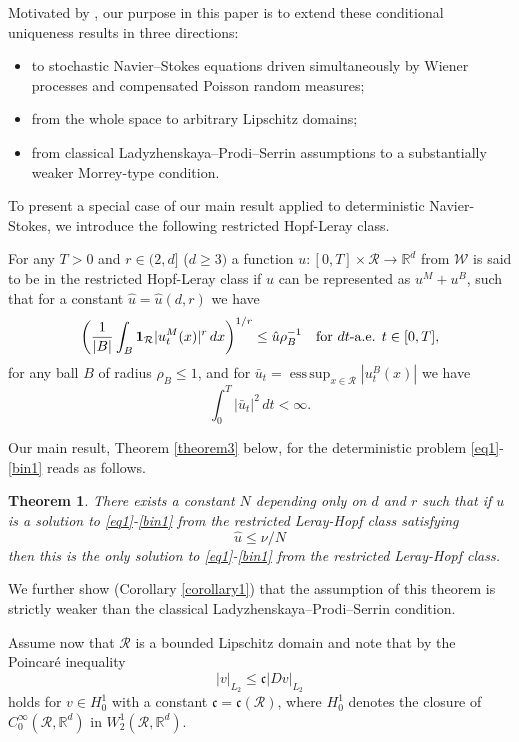\documentclass[11pt,reqno]{amsart}
\DeclareMathOperator*{\esssup}{ess\,sup}
\newtheorem{theorem}{Theorem}[section]
\theoremstyle{definition}
\theoremstyle{remark}
\newcommand\bR{\mathbb{R}}
\newcommand\frc{\mathfrak{c}}
\newcommand\cR{\mathcal{R}}
\newcommand\cW{\mathcal{W}}
\newcommand{\<}{\langle}
\renewcommand{\>}{\rangle}
\begin{document}
Motivated by \cite{GK2026}, our  purpose in this paper 
is to extend these conditional uniqueness results in three directions:

\begin{itemize}
\item to stochastic Navier–Stokes equations driven simultaneously 
by Wiener processes and compensated Poisson random measures;

\item from the whole space to arbitrary Lipschitz domains;

\item from classical Ladyzhenskaya–Prodi–Serrin assumptions to a substantially 
weaker Morrey-type condition.
\end{itemize}
To present a special case of our main result applied to deterministic Navier-Stokes,  
we introduce the following restricted Hopf-Leray class. 

For any $T>0$ and $r\in(2,d]$ ($d\geq3)$ a function $u:[0,T]\times\cR\to\bR^d$ 
from $\cW$ is said to be in the restricted Hopf-Leray class if $u$ can be represented 
as $u^{M}+u^{B}$, such that for a constant $\hat u=\hat u(d,r)$ we have 
$$
\left(\frac{1}{|B|}\int_{B}{\bf1}_{\cR}|u^M_t(x)|^{r}
\,dx\right)^{1/r}\leq \hat u\rho_{B}^{-1} \quad\text{for $dt$-a.e. $t\in[0,T]$}, 
$$
for any ball $B$ of radius $\rho_{B}\leq 1$, and for $\bar u_t=\esssup_{x\in\cR}|u^B_t(x)|$ 
we have 
$$
\int_0^T|\bar u_t|^2\,dt<\infty. 
$$ 

Our main result, Theorem \ref{theorem3} below, 
for the deterministic problem  \eqref{eq1}-\eqref{bin1}
reads as follows. 
\begin{theorem}
                      \label{theorem1}
There exists a constant $N$ depending only on $d$ and $r$ such that 
if $u$ is a solution to \eqref{eq1}-\eqref{bin1} from the restricted Leray-Hopf 
class satisfying 
$$
\hat u\leq \nu/N
$$
then this is the only solution to  \eqref{eq1}-\eqref{bin1} from 
the restricted Leray-Hopf class. 
 \end{theorem}
We further show (Corollary \ref{corollary1}) 
that the assumption of this theorem is strictly weaker than the classical 
Ladyzhenskaya–Prodi–Serrin condition.


Assume now that $\cR$ is a bounded Lipschitz domain and note that 
by the Poincar\'e inequality 
\begin{equation}
                             \label{Poincare}
|v|_{L_2}\leq \frc|Dv|_{L_2}
\end{equation}
holds for $v\in H^1_0$ with a constant $\frc=\frc(\cR)$, where $H^1_0$ denotes 
the closure of $C^{\infty}_{0}(\cR,\bR^d)$ in $W^1_2(\cR,\bR^d)$. 
\end{document}
